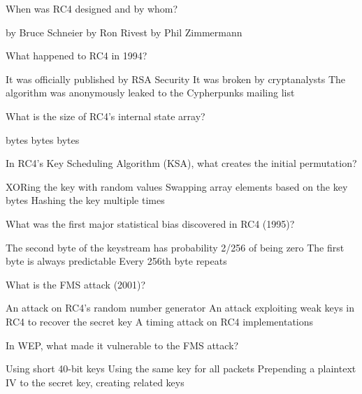 \documentclass[10pt,a4paper,american]{exam}
\begin{document}
\begin{questions}
	\question When was RC4 designed and by whom?
	\begin{randomizechoices}
		 by Bruce Schneier
		 by Ron Rivest
		 by Phil Zimmermann
	\end{randomizechoices}

	\question What happened to RC4 in 1994?
	\begin{randomizechoices}
		\choice It was officially published by RSA Security
		\choice It was broken by cryptanalysts
		\CorrectChoice The algorithm was anonymously leaked to the Cypherpunks mailing list
	\end{randomizechoices}

	\question What is the size of RC4's internal state array?
	\begin{randomizechoices}
		 bytes
		 bytes
		 bytes
	\end{randomizechoices}

	\question In RC4's Key Scheduling Algorithm (KSA), what creates the initial permutation?
	\begin{randomizechoices}
		\choice XORing the key with random values
		\CorrectChoice Swapping array elements based on the key bytes
		\choice Hashing the key multiple times
	\end{randomizechoices}

	\question What was the first major statistical bias discovered in RC4 (1995)?
	\begin{randomizechoices}
		\CorrectChoice The second byte of the keystream has probability 2/256 of being zero
		\choice The first byte is always predictable
		\choice Every 256th byte repeats
	\end{randomizechoices}

	\question What is the FMS attack (2001)?
	\begin{randomizechoices}
		\choice An attack on RC4's random number generator
		\CorrectChoice An attack exploiting weak keys in RC4 to recover the secret key
		\choice A timing attack on RC4 implementations
	\end{randomizechoices}

	\question In WEP, what made it vulnerable to the FMS attack?
	\begin{randomizechoices}
		\choice Using short 40-bit keys
		\choice Using the same key for all packets
		\CorrectChoice Prepending a plaintext IV to the secret key, creating related keys
	\end{randomizechoices}


\end{questions}
\end{document}
